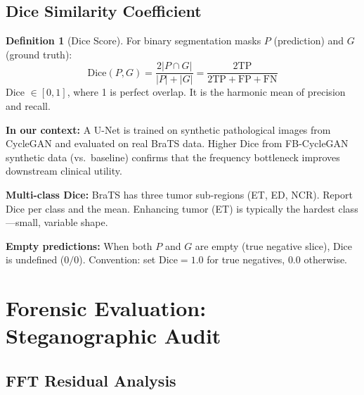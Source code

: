 \documentclass[11pt,a4paper]{article}
\theoremstyle{definition}
\newtheorem{definition}{Definition}[section]
\begin{document}
\subsection{Dice Similarity Coefficient}

\begin{definition}[Dice Score]
For binary segmentation masks $P$ (prediction) and $G$ (ground truth):
\begin{equation}
    \text{Dice}(P, G) = \frac{2|P \cap G|}{|P| + |G|} = \frac{2 \text{TP}}{2\text{TP} + \text{FP} + \text{FN}}
\end{equation}
Dice $\in [0, 1]$, where 1 is perfect overlap. It is the harmonic mean of precision and recall.
\end{definition}

\textbf{In our context:} A U-Net is trained on synthetic pathological images from CycleGAN and evaluated on real BraTS data. Higher Dice from FB-CycleGAN synthetic data (vs.\ baseline) confirms that the frequency bottleneck improves downstream clinical utility.

\begin{edgecase}
\textbf{Multi-class Dice:} BraTS has three tumor sub-regions (ET, ED, NCR). Report Dice per class and the mean. Enhancing tumor (ET) is typically the hardest class---small, variable shape.

\vspace{0.3em}
\textbf{Empty predictions:} When both $P$ and $G$ are empty (true negative slice), Dice is undefined ($0/0$). Convention: set $\text{Dice} = 1.0$ for true negatives, $0.0$ otherwise.
\end{edgecase}

\section{Forensic Evaluation: Steganographic Audit}

\subsection{FFT Residual Analysis}
\end{document}
